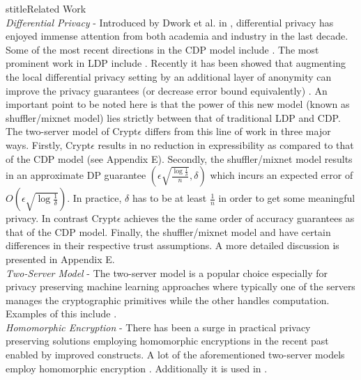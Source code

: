 stitle{Related Work }\\\textit{Differential Privacy }- Introduced by Dwork et al. in \cite{Dork}, differential privacy has enjoyed immense attention from both academia and industry in the last decade. Some of the most recent directions in the \textsf{CDP} model include \cite{MVG,Blocki,AHP,DAWA,hist1,hist2,hist3,hist4,hist6,hist7,hist8,A1,A2,A3,A4,A5,A6,A7,A8,u1,u2,MWEM}. The most prominent work in \textsf{LDP} include \cite{LDP1, LDP2, Rappor1,HH,Rappor2,HH2,Cormode, CALM,15,itemset}.
Recently it has been showed that augmenting the local differential privacy setting by an additional layer of anonymity can improve the privacy
guarantees (or decrease error bound equivalently) \cite{mixnets,Prochlo,amplification}.  An important point to be noted here is that the power of this new model (known as shuffler/mixnet model) lies strictly between that of traditional \textsf{LDP} and \textsf{CDP}. The two-server model of Crypt$\epsilon$ differs from this line of work in three major ways. Firstly, Crypt$\epsilon$ results in no reduction in expressibility as compared to that of the \textsf{CDP} model (see Appendix E). Secondly, the shuffler/mixnet model results in an approximate DP guarantee $(\epsilon\sqrt{\frac{\log\frac{1}{\delta}}{n}},\delta)$ which incurs an expected error of $O(\epsilon\sqrt{\log\frac{1}{\delta}})$.  In practice, $\delta$ has to be at least $\frac{1}{n}$ in order to get some meaningful privacy. In contrast Crypt$\epsilon$ achieves the the same order of accuracy guarantees as that of the \textsf{CDP} model. Finally, the shuffler/mixnet model and \system have certain differences in their respective trust assumptions. A more detailed discussion is presented in Appendix E. %
\\\textit{Two-Server Model} - The two-server model is a popular choice especially for privacy preserving machine learning approaches where typically one of the servers manages the cryptographic primitives while the other handles computation. Examples of this include \cite{Boneh1,Boneh2,Ridge2,Matrix2,secureML,LReg,Ver}. \\\textit{Homomorphic Encryption } - There has been a surge in practical privacy preserving solutions employing homomorphic encryptions in the recent past enabled by improved constructs. A lot of the aforementioned two-server models employ homomorphic encryption \cite{Boneh1,Boneh2,LReg,Matrix2}.  Additionally it is used in \cite{CryptoDL,CryptoNet,NN, Irene2, grid}.
